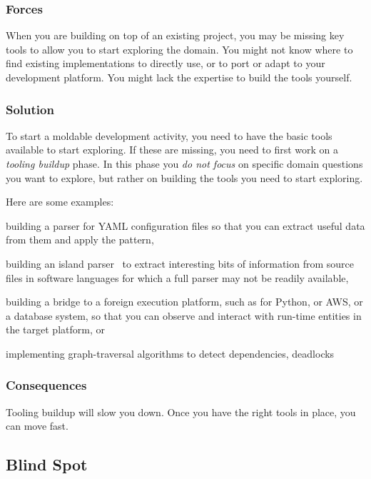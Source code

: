 \documentclass[sigconf]{acmart}
\newcommand{\pattern}[1]{\emph{\nameref{pat:#1}}\xspace}
\begin{document}
\subsubsection*{Forces}
When you are building on top of an existing project, you may be missing key tools to allow you to start exploring the domain.
You might not know where to find existing implementations to directly use, or to port or adapt to your development platform.
You might lack the expertise to build the tools yourself.

\subsubsection*{Solution}
To start a moldable development activity, you need to have the basic tools available to start exploring.
If these are missing, you need to first work on a \emph{tooling buildup} phase.
In this phase you \emph{do not focus} on specific domain questions you want to explore, but rather on building the tools you need to start exploring.

Here are some examples:
\begin{inparaenum}[(i)]
\item building a parser for YAML configuration files so that you can extract useful data from them and apply the \pattern{moldableDataWrapper} pattern,
\item building an island parser~\cite{Kurs14b} to extract interesting bits of information from source files in software languages for which a full parser may not be readily available,
\item building a bridge to a foreign execution platform, such as for Python, or AWS, or a database system, so that you can observe and interact with run-time entities in the target platform, or
\item implementing graph-traversal algorithms to detect dependencies, deadlocks \etc
\end{inparaenum}

\subsubsection*{Consequences}
Tooling buildup will slow you down.
Once you have the right tools in place, you can move fast.

\subsection*{Blind Spot}\label{pat:blindSpot}
\end{document}
